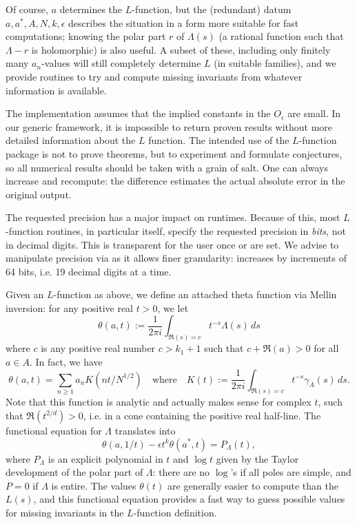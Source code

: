 Of course, $a$ determines the $L$-function, but the (redundant) datum $a,a^*,
A, N, k, \epsilon$ describes the situation in a form more suitable for fast
computations; knowing the polar part $r$ of $\Lambda(s)$ (a rational function
such that $\Lambda-r$ is holomorphic) is also useful. A subset of these,
including only finitely many $a_n$-values will still completely determine $L$
(in suitable families), and we provide routines to try and compute missing
invariants from whatever information is available.

The implementation assumes that the implied constants in the $O_\epsilon$ are
small. In our generic framework, it is impossible to return proven results
without more detailed information about the $L$ function. The intended use of
the $L$-function package is not to prove theorems, but to experiment and
formulate conjectures, so all numerical results should be taken with a grain
of salt. One can always increase  and recompute: the
difference estimates the actual absolute error in the original output.

 The requested precision has a major impact on runtimes.
Because of this, most $L$-function routines, in particular  itself,
specify the requested precision in \emph{bits}, not in decimal digits.
This is transparent for the user once  or
 are set. We advise to manipulate precision via
 as it allows finer granularity: 
increases by increments of 64 bits, i.e. 19 decimal digits at a time.


Given an $L$-function as above, we define an attached theta function
via Mellin inversion: for any positive real $t > 0$, we let
$$ \theta(a,t) := \dfrac{1}{2\pi i}\int_{\Re(s) = c} t^{-s} \Lambda(s)\, ds $$
where $c$ is any positive real number $c > k_1+1$ such that $c + \Re(a) > 0$
for all $a\in A$. In fact, we have
$$\theta(a,t) = \sum_{n\geq 1} a_n K(nt/N^{1/2})
\quad\text{where}\quad
K(t) := \dfrac{1}{2\pi i}\int_{\Re(s) = c} t^{-s} \gamma_A(s)\, ds.$$
Note that this function is analytic and actually makes sense for complex $t$,
such that $\Re(t^{2/d}) > 0$, i.e. in a cone containing the positive real
half-line. The functional equation for $\Lambda$ translates into
$$ \theta(a,1/t) - \epsilon t^k\theta(a^*,t) = P_\Lambda(t), $$
where $P_\Lambda$ is an explicit polynomial in $t$ and $\log t$ given by the
Taylor development of the polar part of $\Lambda$: there are no $\log$'s if
all poles are simple, and $P = 0$ if $\Lambda$ is entire. The values
$\theta(t)$ are generally easier to compute than the $L(s)$, and this
functional equation provides a fast way to guess possible values for
missing invariants in the $L$-function definition.

